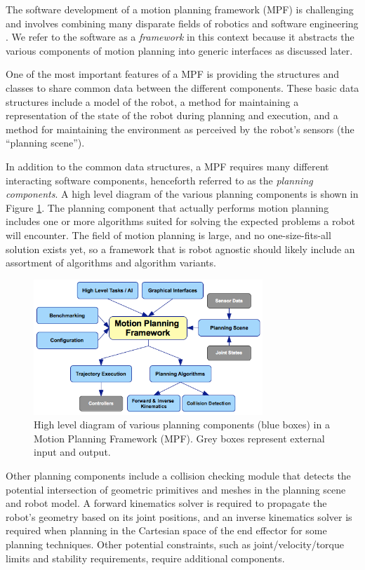 \documentclass[10pt,journal,compsoc]{joser1}
\begin{document}
{The software development of a motion planning framework (MPF) is challenging and
involves combining many disparate fields of robotics and software engineering
\cite{perez2010roadmap}. We refer to the software as a \textit{framework} in
this context because it abstracts the various components of motion planning into
generic interfaces as discussed later.

One of the most important features of a MPF is providing the structures and
classes to share common data between the different components. These basic data
structures include a model of the robot, a method for maintaining a
representation of the state of the robot during planning and execution, and a
method for maintaining the environment as perceived by the robot's sensors (the
``planning scene'').

In addition to the common data structures, a MPF requires many different
interacting software components, henceforth referred to as the \textit{planning
components}. A high level diagram of the various planning components is shown in
Figure \ref{fig:motionplanning_highlevel}. The planning component that actually
performs motion planning includes one or more algorithms suited for solving the
expected problems a robot will encounter. The field of motion planning is large,
and no one-size-fits-all solution exists yet, so a framework that is robot
agnostic should likely include an assortment of algorithms and algorithm
variants.

\begin{figure}[!t]
\centering
\includegraphics[width=3.4in]{coleman_20131110_f05}
\caption{High level diagram of various planning components (blue boxes) in a Motion Planning
Framework (MPF). Grey boxes represent external input and output.}
\label{fig:motionplanning_highlevel}
\end{figure} 

Other planning components include a collision checking module that detects the
potential intersection of geometric primitives and meshes in the planning scene
and robot model. A forward kinematics solver is required to propagate the
robot's geometry based on its joint positions, and an inverse kinematics solver
is required when planning in the Cartesian space of the end effector for some planning techniques. Other potential constraints, such as
joint/velocity/torque limits and stability requirements, require additional
components.

}
\end{document}
